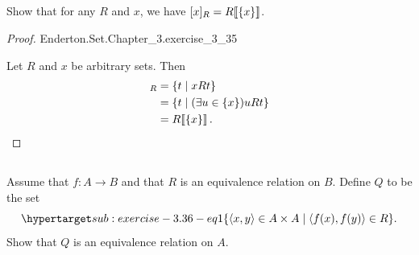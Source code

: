 \documentclass{report}
\newcommand{\pair}[1]{\left< #1 \right>}
\begin{document}
\subsection{}%

Show that for any $R$ and $x$, we have $[x]_R = R\!\left\llbracket\{x\}\right\rrbracket$.

\begin{proof}

    {Enderton.Set.Chapter\_3.exercise\_3\_35}

  Let $R$ and $x$ be arbitrary sets.
  Then
    \begin{align*}
      [x]_R
        & = \{t \mid xRt\} \\
        & = \{t \mid (\exists u \in \{x\})uRt\} \\
        & = \img{R}{\{x\}}.
    \end{align*}

\end{proof}

\subsection{}%

Assume that $f \colon A \rightarrow B$ and that $R$ is an equivalence relation
  on $B$.
Define $Q$ to be the set
  \begin{equation}
    \hyperlabel{sub:exercise-3.36-eq1}
    \{\pair{x, y} \in A \times A \mid \pair{f(x), f(y)} \in R\}.
  \end{equation}
Show that $Q$ is an equivalence relation on $A$.
\end{document}
